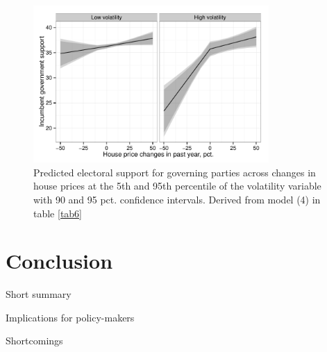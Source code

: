 \documentclass[12pt,a4paper]{article}
\begin{document}
\begin{figure}[htbp]
	\includegraphics[page=1,width=0.8\textwidth]{../figures/volaposnegplot}
	\centering
	\caption{Predicted electoral support for governing parties across changes in house prices at the 5th and 95th percentile of the volatility variable with 90 and 95 pct. confidence intervals. Derived from model (4) in table \ref{tab6}}
	\label{volaposneg}
\end{figure}




\section{Conclusion}
Short summary

Implications for policy-makers

Shortcomings









\clearpage

\singlespacing



\end{document}
